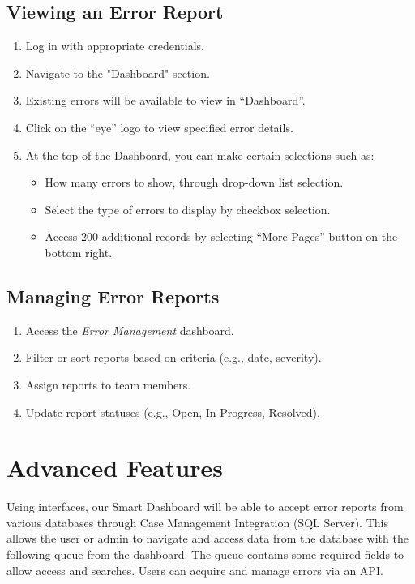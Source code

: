 \documentclass[12pt]{article}
\begin{document}
\subsection{Viewing an Error Report}
\begin{enumerate}
    \item Log in with appropriate credentials.
    \item Navigate to the "Dashboard" section.
    \item Existing errors will be available to view in “Dashboard”.
    \item Click on the “eye” logo to view specified error details.
    \item At the top of the Dashboard, you can make certain selections such as:
        \begin{itemize}
        \item How many errors to show, through drop-down list selection.
        \item Select the type of errors to display by checkbox selection.
        \item Access 200 additional records by selecting “More Pages” button on the bottom right.
	\end{itemize}        
\end{enumerate}

\subsection{Managing Error Reports}
\begin{enumerate}
    \item Access the \textit{Error Management} dashboard.
    \item Filter or sort reports based on criteria (e.g., date, severity).
    \item Assign reports to team members.
    \item Update report statuses (e.g., Open, In Progress, Resolved).
\end{enumerate}

\section{Advanced Features}
Using interfaces, our Smart Dashboard will be able to accept error reports from various databases through Case Management Integration (SQL Server). This allows the user or admin to navigate and access data from the database with the following queue from the dashboard. The queue contains some required fields to allow access and searches.  Users can acquire and manage errors via an API.
\end{document}
